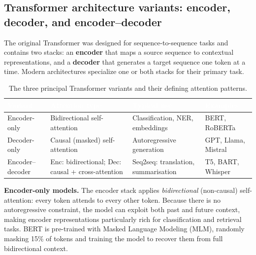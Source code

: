 \documentclass[11pt,a4paper]{article}
\begin{document}
	\subsection{Transformer architecture variants: encoder, decoder, and encoder--decoder}

	The original Transformer \parencite{vaswani2017} was designed for sequence-to-sequence tasks and contains two stacks: an \textbf{encoder} that maps a source sequence to contextual representations, and a \textbf{decoder} that generates a target sequence one token at a time. Modern architectures specialize one or both stacks for their primary task.

	\begin{table}[ht]
		\centering
		\small\sffamily
		\renewcommand{\arraystretch}{1.35}
		\begin{tabular}{@{}L{2.8cm} L{3.2cm} L{4.0cm} L{3.5cm}@{}}
			\toprule
			\textcolor{white}{\textbf{Variant}} &
			\textcolor{white}{\textbf{Attention type}} &
			\textcolor{white}{\textbf{Typical use}} &
			\textcolor{white}{\textbf{Examples}} \\
			\midrule
			Encoder-only  & Bidirectional self-attention & Classification, NER, embeddings & BERT, RoBERTa \\
			Decoder-only  & Causal (masked) self-attention & Autoregressive generation & GPT, Llama, Mistral \\
			Encoder--decoder & Enc: bidirectional; Dec: causal + cross-attention & Seq2seq: translation, summarisation & T5, BART, Whisper \\
			\bottomrule
		\end{tabular}
		\caption{The three principal Transformer variants and their defining attention patterns.}
		\label{tab:transformer_variants}
	\end{table}

	\textbf{Encoder-only models.} The encoder stack applies \emph{bidirectional} (non-causal) self-attention: every token attends to every other token. Because there is no autoregressive constraint, the model can exploit both past and future context, making encoder representations particularly rich for classification and retrieval tasks. BERT \parencite{devlin2019} is pre-trained with Masked Language Modeling (MLM), randomly masking 15\% of tokens and training the model to recover them from full bidirectional context.
\end{document}
